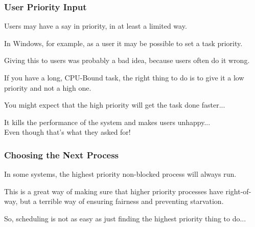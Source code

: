 \begin{frame}
\frametitle{User Priority Input}

Users may have a say in priority, in at least a limited way. 

In Windows, for example, as a user it may be possible to set a task priority. 

Giving this to users was probably a bad idea, because users often do it wrong. 

If you have a long, CPU-Bound task, the right thing to do is to give it a low priority and not a high one. 

You might expect that the high priority will get the task done faster... 

It kills the performance of the system and makes users unhappy...\\
\quad Even though that's what they asked for!



\end{frame}

\begin{frame}
\frametitle{Choosing the Next Process}

In some systems, the highest priority non-blocked process will always run. 

This is a great way of making sure that higher priority processes have right-of-way, but a terrible way of ensuring fairness and preventing starvation. 

So, scheduling is not as easy as just finding the highest priority thing to do...

\end{frame}



